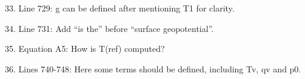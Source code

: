 \documentclass[12pt,oneside,a4paper]{article}%
\begin{document}
{\color{blue}{Done.}} \newline

33. Line 729: g can be defined after mentioning T1 for clarity. \newline

{\color{blue}{Done.}} \newline

34. Line 731: Add “is the” before “surface geopotential”. \newline

{\color{blue}{Done.}} \newline

35. Equation A5: How is T(ref) computed? \newline

{\color{blue}{Defined in equation A1.}} \newline

36. Lines 740-748: Here some terms should be defined, including Tv, qv and p0. \newline

{\color{blue}{Added definitions for Tv and thetav. p0 is defined just below equation A3. I don't see a ``qv".}}

\end{document}
